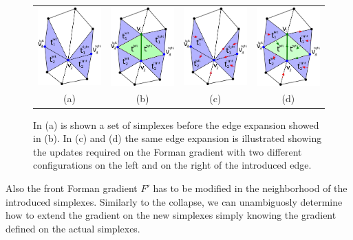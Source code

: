 \documentclass[preprint,5p,times,onecolumn]{article}
\begin{document}
\begin{figure}
	\begin{tabular}{c c c c}
		\includegraphics[width=0.22\linewidth]{images/after_edge_collapse} &
		\includegraphics[width=0.22\linewidth]{images/after_edge_refinement} &
		\includegraphics[width=0.22\linewidth]{images/gradient_before_refinement} &
		\includegraphics[width=0.22\linewidth]{images/gradient_after_refinement} \\
		(a) & (b) & (c) & (d) \\
	\end{tabular}
	\label{fig:geom-insert}
	\caption{In (a) is shown a set of simplexes before the edge expansion showed in (b). In (c) and (d) the same edge expansion is illustrated showing the updates required on the Forman gradient with two different configurations on the left and on the right of the introduced edge.}
\end{figure}

Also the front Forman gradient $F'$ has to be modified in the neighborhood of the introduced simplexes. Similarly to the collapse, we can unambiguosly determine how to extend the gradient on the new simplexes simply knowing the gradient defined on the actual simplexes.
\end{document}
